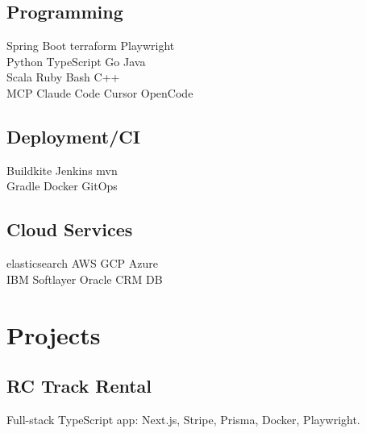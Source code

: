 \documentclass[letterpaper]{resume} %
\begin{document}
\begin{minipage}[t]{0.33\textwidth}
\subsection{Programming}

 Spring Boot \textbullet{} terraform \textbullet{} Playwright \\
\sectionspace
{}
Python \textbullet{} TypeScript \textbullet{} Go \textbullet{} Java \\

\sectionspace
{}
Scala \textbullet{} Ruby \textbullet{} Bash \textbullet{} C++ \\

\sectionspace
{}
MCP \textbullet{} Claude Code \textbullet{} Cursor \textbullet{} OpenCode \\

\sectionspace

\subsection{Deployment/CI}
Buildkite \textbullet{} Jenkins \textbullet{} mvn\\
Gradle \textbullet{} Docker \textbullet{} GitOps\\ 

\sectionspace %

\subsection{Cloud Services}
elasticsearch \textbullet{} AWS \textbullet{} GCP \textbullet{} Azure\\
IBM Softlayer \textbullet{} Oracle CRM DB\\


\section{Projects}
\subsection{RC Track Rental}
Full-stack TypeScript app: Next.js, Stripe, Prisma, Docker, Playwright. \\

\sectionspace


\end{minipage}
\end{document}
